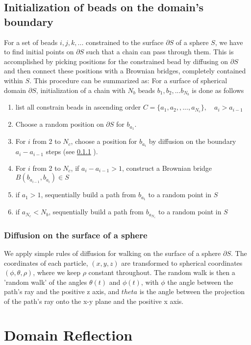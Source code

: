 \documentclass[12pt]{report}
\begin{document}
\subsection{Initialization of beads on the domain's boundary}
For a set of beads $ i,j,k,...$ constrained to the surface $\partial S$ of a sphere $S$, we have to find initial points on $\partial S$ such that a chain can pass through them. This is accomplished by picking positions for the constrained bead by diffusing on $\partial S$ and then connect these positions with a Brownian bridges, completely contained within $S$. This procedure can be summarized as: 
For a surface of spherical domain $\partial S$, initialization of a chain with $N_b$ beads $b_1,b_2,...b_{N_b}$ is done as follows
\begin{enumerate}
\item list all constrain beads in ascending order $C=\{a_1,a_2,,...,a_{N_c}\}, \quad a_i>a_{i-1}$
\item Choose a random position on $\partial S$ for $b_{a_1}$.
\item For $i$ from 2 to $N_c$, choose a position for $b_{a_i}$ by diffusion on the boundary $a_i -a_{i-1}$ steps (see \ref{subsubSec_diffusionOntheSurface} ).
\item For $i$ from 2 to $N_c$, if $a_{i}-a_{i-1} >1$, construct a Brownian bridge $B(b_{a_{i-1}},b_{a_i})\in S$ 
\item if $a_1>1$, sequentially build a path from $b_{a_1}$ to a random point in $S$
\item if $a_{N_c}<N_b$, sequentially build a path from $b_{a_{N_c}}$ to a random point in $S$ 
\end{enumerate}

\subsubsection{Diffusion on the surface of a sphere}\label{subsubSec_diffusionOntheSurface}
We apply simple rules of diffusion for walking on the surface of a sphere $\partial S$. The coordinates of each particle, $(x,y,z)$ are transformed to spherical coordinates $(\phi,\theta,\rho)$, where we keep $\rho$ constant throughout. The random walk is then a 'random walk' of the angles $\theta(t)$ and $\phi(t)$, with $\phi$ the angle between the path's ray and the positive z axis, and $theta$ is the angle between the projection of the path's ray onto the x-y plane and the positive x axis.


\section{Domain Reflection}
\end{document}
